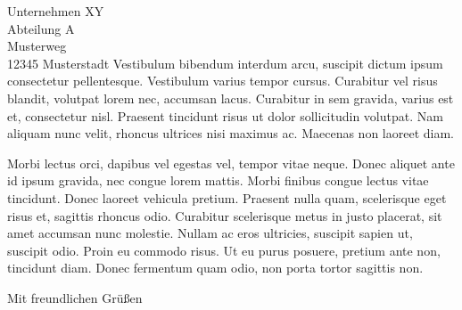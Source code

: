 \documentclass[
	foldmarks=false,
	pagenumber=false,
	backaddress=on,
	parskip=half,
	addrfield=true
]{scrlttr2}
\begin{document}
\begin{letter}{Unternehmen XY \\ Abteilung A \\ Musterweg \\ 12345 Musterstadt}
Vestibulum bibendum interdum arcu, suscipit dictum ipsum consectetur pellentesque. Vestibulum varius tempor cursus. Curabitur vel risus blandit, volutpat lorem nec, accumsan lacus. Curabitur in sem gravida, varius est et, consectetur nisl. Praesent tincidunt risus ut dolor sollicitudin volutpat. Nam aliquam nunc velit, rhoncus ultrices nisi maximus ac. Maecenas non laoreet diam.

Morbi lectus orci, dapibus vel egestas vel, tempor vitae neque. Donec aliquet ante id ipsum gravida, nec congue lorem mattis. Morbi finibus congue lectus vitae tincidunt. Donec laoreet vehicula pretium. Praesent nulla quam, scelerisque eget risus et, sagittis rhoncus odio. Curabitur scelerisque metus in justo placerat, sit amet accumsan nunc molestie. Nullam ac eros ultricies, suscipit sapien ut, suscipit odio. Proin eu commodo risus. Ut eu purus posuere, pretium ante non, tincidunt diam. Donec fermentum quam odio, non porta tortor sagittis non. 

\closing{Mit freundlichen Grüßen}


\end{letter}
\end{document}
